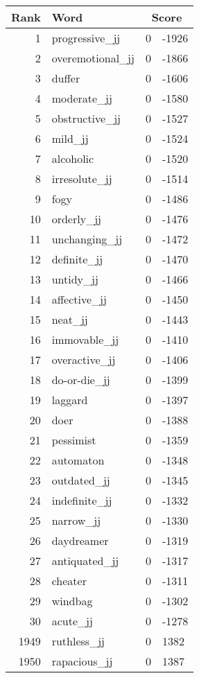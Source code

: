 \begin{longtable}[!htbp]{| rlr@{.}l |}
    \hline
    \textbf{Rank} & \textbf{Word} & \multicolumn{2}{c|}{\textbf{Score}} \\
    \hline
    \endhead
    1 & progressive\_jj & 0 & -1926 \\
    2 & overemotional\_jj & 0 & -1866 \\
    3 & duffer & 0 & -1606 \\
    4 & moderate\_jj & 0 & -1580 \\
    5 & obstructive\_jj & 0 & -1527 \\
    6 & mild\_jj & 0 & -1524 \\
    7 & alcoholic & 0 & -1520 \\
    8 & irresolute\_jj & 0 & -1514 \\
    9 & fogy & 0 & -1486 \\
    10 & orderly\_jj & 0 & -1476 \\
    11 & unchanging\_jj & 0 & -1472 \\
    12 & definite\_jj & 0 & -1470 \\
    13 & untidy\_jj & 0 & -1466 \\
    14 & affective\_jj & 0 & -1450 \\
    15 & neat\_jj & 0 & -1443 \\
    16 & immovable\_jj & 0 & -1410 \\
    17 & overactive\_jj & 0 & -1406 \\
    18 & do-or-die\_jj & 0 & -1399 \\
    19 & laggard & 0 & -1397 \\
    20 & doer & 0 & -1388 \\
    21 & pessimist & 0 & -1359 \\
    22 & automaton & 0 & -1348 \\
    23 & outdated\_jj & 0 & -1345 \\
    24 & indefinite\_jj & 0 & -1332 \\
    25 & narrow\_jj & 0 & -1330 \\
    26 & daydreamer & 0 & -1319 \\
    27 & antiquated\_jj & 0 & -1317 \\
    28 & cheater & 0 & -1311 \\
    29 & windbag & 0 & -1302 \\
    30 & acute\_jj & 0 & -1278 \\
    1949 & ruthless\_jj & 0 & 1382 \\
    1950 & rapacious\_jj & 0 & 1387 \\

\end{longtable}
